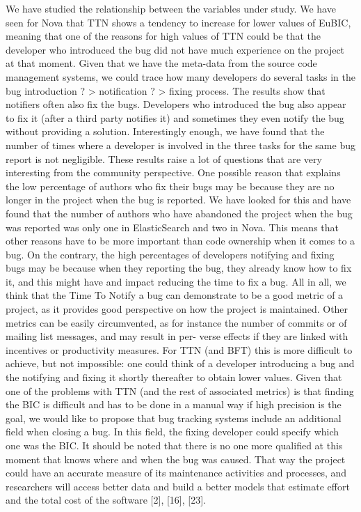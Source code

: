 \documentclass[a4paper, 12pt]{book}
\begin{document}
We have studied the relationship between the variables under study. We have seen for Nova that TTN shows a tendency to increase for lower values of EuBIC, meaning that one of the reasons for high values of TTN could be that the developer who introduced the bug did not have much experience on the project at that moment.
Given that we have the meta-data from the source code management systems, we could trace how many developers do several tasks in the bug introduction ? > notification ? > fixing process. The results show that notifiers often also fix the bugs. Developers who introduced the bug also appear to fix it (after a third party notifies it) and sometimes they even notify the bug without providing a solution. Interestingly enough, we have found that the number of times where a developer is involved in the three tasks for the same bug report is not negligible. These results raise a lot of questions that are very interesting from the community perspective. One possible reason that explains the low percentage of authors who fix their bugs may be because they are no longer in the project when the bug is reported. We have looked for this and have found that the number of authors who have abandoned the project when the bug was reported was only one in ElasticSearch and two in Nova. This means that other reasons have to be more important than code ownership when it comes to a bug. On the contrary, the high percentages of developers notifying and fixing bugs may be because when they reporting the bug, they already know how to fix it, and this might have and impact reducing the time to fix a bug.
All in all, we think that the Time To Notify a bug can demonstrate to be a good metric of a project, as it provides good perspective on how the project is maintained. Other metrics can be easily circumvented, as for instance the number of commits or of mailing list messages, and may result in per- verse effects if they are linked with incentives or productivity measures. For TTN (and BFT) this is more difficult to achieve, but not impossible: one could think of a developer introducing a bug and the notifying and fixing it shortly thereafter to obtain lower values.
Given that one of the problems with TTN (and the rest of associated metrics) is that finding the BIC is difficult and has to be done in a manual way if high precision is the goal, we would like to propose that bug tracking systems include an additional field when closing a bug. In this field, the fixing developer could specify which one was the BIC. It should be noted that there is no one more qualified at this moment that knows where and when the bug was caused. That way the project could have an accurate measure of its maintenance activities and processes, and researchers will access better data and build a better models that estimate effort and the total cost of the software [2], [16], [23].
\end{document}
